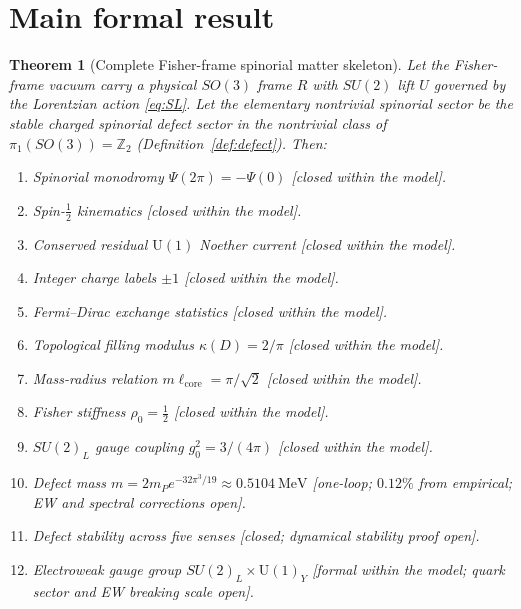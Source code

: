 \documentclass[12pt]{article}
\newtheorem{theorem}{Theorem}[section]
\theoremstyle{definition}
\theoremstyle{remark}
\begin{document}
\section{Main formal result}
\label{sec:main}

\begin{theorem}[Complete Fisher-frame spinorial matter skeleton]
\label{thm:main}
Let the Fisher-frame vacuum carry a physical $SO(3)$ frame $R$ with $SU(2)$
lift $U$ governed by the Lorentzian action \eqref{eq:SL}.  Let the
\emph{elementary nontrivial spinorial sector} be the stable charged spinorial
defect sector in the nontrivial class of $\pi_1(SO(3))=\mathbb{Z}_2$
(Definition~\ref{def:defect}).  Then:
\begin{enumerate}
\item[(i)] Spinorial monodromy $\Psi(2\pi)=-\Psi(0)$
  \textnormal{[closed within the model]}.
\item[(ii)] Spin-$\tfrac{1}{2}$ kinematics
  \textnormal{[closed within the model]}.
\item[(iii)] Conserved residual $\mathrm{U}(1)$ Noether current
  \textnormal{[closed within the model]}.
\item[(iv)] Integer charge labels $\pm 1$
  \textnormal{[closed within the model]}.
\item[(v)] Fermi--Dirac exchange statistics
  \textnormal{[closed within the model]}.
\item[(vi)] Topological filling modulus $\kappa(D)=2/\pi$
  \textnormal{[closed within the model]}.
\item[(vii)] Mass-radius relation $m\ell_{\mathrm{core}}=\pi/\sqrt{2}$
  \textnormal{[closed within the model]}.
\item[(viii)] Fisher stiffness $\rho_0=\tfrac{1}{2}$
  \textnormal{[closed within the model]}.
\item[(ix)] $SU(2)_L$ gauge coupling $g_0^2=3/(4\pi)$
  \textnormal{[closed within the model]}.
\item[(x)] Defect mass $m=2m_P e^{-32\pi^3/19}\approx 0.5104\ \mathrm{MeV}$
  \textnormal{[one-loop; }$0.12\%$\textnormal{ from empirical; EW
  and spectral corrections open]}.
\item[(xi)] Defect stability across five senses
  \textnormal{[closed; dynamical stability proof open]}.
\item[(xii)] Electroweak gauge group $SU(2)_L\times\mathrm{U}(1)_Y$
  \textnormal{[formal within the model; quark sector and EW breaking scale open]}.

\end{enumerate}
\end{theorem}
\end{document}
